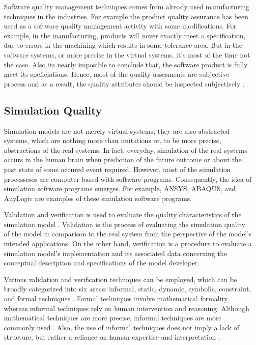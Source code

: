 \documentclass{llncs}
\begin{document}
    Software quality management techniques comes from already used manufacturing techniques in the  industries. For example the  product quality assurance has been used as a software quality management activity with some modifications. For example, in the manufacturing, products will never exactly meet a specification, due to errors in the machining which results in some tolerance area. But in the software systems, or more precise in the virtual systems, it's most of the time not the case. Also its nearly imposible to conclude that, 
    the software product is fully meet its speficiations. 
    Hence, most of the quality assesments are subjective process and as a result, the quality attributes should be inspected subjectively \cite{SoftwareEngineering}.  

    \subsection{Simulation Quality}
    Simulation models are not merely virtual systems; they are also abstracted systems, 
    which are nothing more than imitations or, to be more precise, abstractions of the real systems. 
    In fact, everyday, simulation of the real systems occurs in the human brain when prediction of the future outcome or  about the 
    past state of some occured event required\cite{MobusSystemTheory}. However, most of the simulation processeses are computer 
    based with software programs. Consequently, the idea of simulation software programs emerges. 
    For example, ANSYS\cite{Ansys}, ABAQUS\cite{Abaqus}, and AnyLogic\cite{AnyLogic} are examples of these simulation software programs. 

    Validation and verification is used to evaluate the quality characteristics of the simulation 
    model \cite{StewartSimulation,VerificationValidationSergent,OsmanBalci}. 
    Validation is the process of evaluating the simulation quality of the model in comparison to 
    the real system from the perspective of the model's intended applications.
    On the other hand, verification is a procedure to 
    evaluate a simulation model's implementation and its associated 
    data concerning the conceptual description and specifications of the 
    model developer\cite{StewartSimulation,VerificationValidationSergent}.

    Various validation and verification techniques can be employed, which can be broadly categorized into six areas: informal, static, dynamic, symbolic, constraint, and formal techniques \cite{balcicategories}\cite{balcitechniques}. Formal techniques involve mathematical formality, whereas informal techniques rely on human intervention and reasoning. Although mathematical techniques are more precise, informal techniques 
    are more commonly used \cite{balcicategories}. Also, the use of informal techniques does not imply a lack of structure, but rather a reliance on human expertise and interpretation \cite{balcitechniques}.
\end{document}
